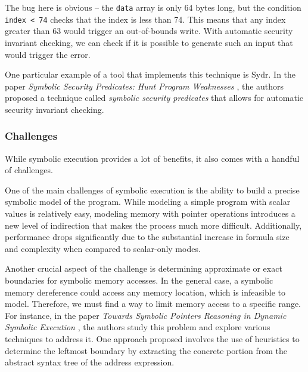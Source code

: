 The bug here is obvious -- the \texttt{data} array is only 64 bytes long, but the condition \texttt{index < 74} checks that the index is less than 74. This means that any index greater than 63 would trigger an out-of-bounds write. With automatic security invariant checking, we can check if it is possible to generate such an input that would trigger the error.

One particular example of a tool that implements this technique is Sydr. In the paper \textit{Symbolic Security Predicates: Hunt Program Weaknesses} \cite{symbolic-security-predicates}, the authors proposed a technique called \textit{symbolic security predicates} that allows for automatic security invariant checking.

\subsubsection{Challenges} \label{symbolic_execution:challenges}

While symbolic execution provides a lot of benefits, it also comes with a handful of challenges.

 \label{symbolic_execution:challenges:symbolic_memory}

One of the main challenges of symbolic execution is the ability to build a precise symbolic model of the program. While modeling a simple program with scalar values is relatively easy, modeling memory with pointer operations introduces a new level of indirection that makes the process much more difficult. Additionally, performance drops significantly due to the substantial increase in formula size and complexity when compared to scalar-only modes.

Another crucial aspect of the challenge is determining approximate or exact boundaries for symbolic memory accesses. In the general case, a symbolic memory dereference could access any memory location, which is infeasible to model. Therefore, we must find a way to limit memory access to a specific range. For instance, in the paper \textit{Towards Symbolic Pointers Reasoning in Dynamic Symbolic Execution} \cite{symbolic-pointers-reasoning}, the authors study this problem and explore various techniques to address it. One approach proposed involves the use of heuristics to determine the leftmost boundary by extracting the concrete portion from the abstract syntax tree of the address expression.


